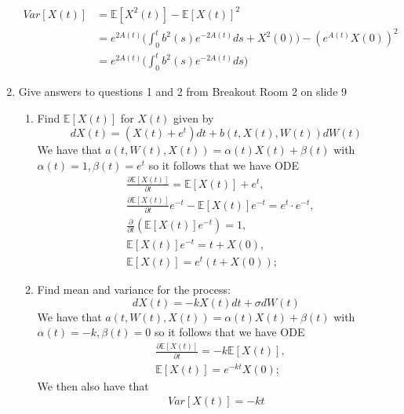 \documentclass[12pt,twoside, letter]{exam}
\theoremstyle{definition}
\newcommand{\ee}{\mathbb{E}}
\begin{document}
\begin{enumerate}
\begin{solution}
\begin{align*}
        Var[X(t)] &= \ee[X^2(t)] - \ee[X(t)]^2 \\
        &= e^{2 A(t)} \bigg(\int^t_0 b^2(s) e^{-2 A(t)} ds + X^2(0)\bigg) - (e^{A(t)}X(0))^2 \\
        &= e^{2 A(t)} \bigg(\int^t_0 b^2(s) e^{-2 A(t)} ds \bigg)
      \end{align*}
    \end{solution}
  \item Give answers to questions 1 and 2 from Breakout Room 2 on slide 9
    \begin{solution}
      \begin{enumerate}
        \item Find $\ee[X(t)]$ for $X(t)$ given by
          \begin{equation*}
            dX(t) = (X(t) + e^t) dt + b(t, X(t), W(t))dW(t)
          \end{equation*}
          We have that $a(t, W(t), X(t)) = \alpha(t)X(t) + \beta(t)$ with $\alpha(t) = 1, \beta(t) = e^t$ so it follows that we have ODE
          \begin{align*}
            &\frac{\partial \ee[X(t)]}{\partial t} = \ee[X(t)] + e^t, \\
            &\frac{\partial \ee[X(t)]}{\partial t}e^{-t} - \ee[X(t)]e^{-t} = e^t\cdot e^{-t}, \\
            &\frac{\partial}{\partial t}(\ee[X(t)]e^{-t}) = 1, \\
            &\ee[X(t)]e^{-t} = t + X(0), \\
            &\ee[X(t)] = e^{t}(t + X(0));
          \end{align*}
        \item Find mean and variance for the process:
          \begin{equation*}
            dX(t) = -kX(t)dt + \sigma dW(t)
          \end{equation*}
          We have that $a(t, W(t), X(t)) = \alpha(t)X(t) + \beta(t)$ with $\alpha(t) = -k, \beta(t) = 0$ so it follows that we have ODE
            \begin{align*}
              &\frac{\partial \ee[X(t)]}{\partial t} = -k\ee[X(t)], \\
              &\ee[X(t)] = e^{-kt}X(0);
            \end{align*}
          We then also have that
            \begin{align*}
              Var[X(t)] = -kt
            \end{align*}
      \end{enumerate}
    \end{solution}
\end{enumerate}
\end{document}
